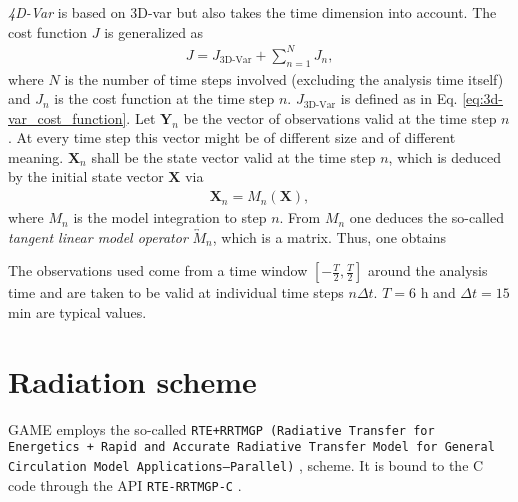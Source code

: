 \documentclass{article}
\begin{document}
\textit{4D-Var} is based on 3D-var but also takes the time dimension into account. The cost function $J$ is generalized as
%
\begin{eqnarray}
J = J_{\text{3D-Var}} + \sum_{n = 1}^NJ_n,
\end{eqnarray}
%
where $N$ is the number of time steps involved (excluding the analysis time itself) and $J_n$ is the cost function at the time step $n$. $J_{\text{3D-Var}}$ is defined as in Eq. \eqref{eq:3d-var_cost_function}. Let $\mathbf{Y}_n$ be the vector of observations valid at the time step $n$. At every time step this vector might be of different size and of different meaning. $\mathbf{X}_n$ shall be the state vector valid at the time step $n$, which is deduced by the initial state vector $\mathbf{X}$ via
%
\begin{eqnarray}
\mathbf{X}_n = M_n\left(\mathbf{X}\right),
\end{eqnarray}
%
where $M_n$ is the model integration to step $n$. From $M_n$ one deduces the so-called \textit{tangent linear model operator} $\overleftrightarrow{M}_n$, which is a matrix. Thus, one obtains
%
\begin{center}
\end{center}
%
The observations used come from a time window $\left[-\frac{T}{2}, \frac{T}{2}\right]$ around the analysis time and are taken to be valid at individual time steps $n\Delta t$. $T = 6$ h and $\Delta t = 15$ min are typical values.

\section{Radiation scheme}
\label{sec:radiation_scheme}

GAME employs the so-called \texttt{RTE+RRTMGP (Radiative Transfer for Energetics + Rapid and Accurate Radiative Transfer Model for General Circulation Model Applications—Parallel)} \cite{doi:10.1029/2019MS001621}, \cite{rte-rrtmgp-github} scheme. It is bound to the C code through the API \texttt{RTE-RRTMGP-C} \cite{rte-rrtmgp-c-github}.

\appendix

\printbibliography
\end{document}
